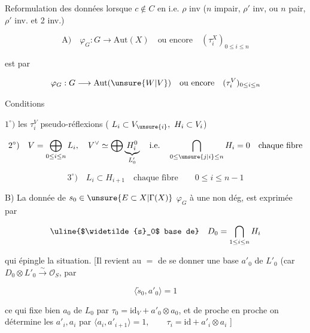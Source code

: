 
Reformulation des données lorsque $c\notin C$ en  i.e. $\rho$ inv ($n$ impair, $\rho'$ inv, ou $n$ pair, $\rho'$ inv. et 2 inv.)

\[
\text{A)}\quad \varphi_G:G\longrightarrow\mathrm{Aut}(X)\quad
\text{ou encore}\quad(\tau_i^X)_{0\le i\le n}
\]

est  par

\[
\varphi_G:G\longrightarrow\mathrm{Aut}(\unsure{W|V})\quad
\text{ou encore}\quad(\tau_i^V)_{0\le i\le n}
\]

Conditions

$1^\circ)$ les $\tau_i^V$ pseudo-réflexions ( $L_i\subset V_{\unsure{i}},\ H_i\subset V_i$)


\[
2^\circ)\quad V=\bigoplus_{0\le i\le n}L_i,\quad V^\vee\simeq
\bigoplus\underbrace{H_i^0}_{L'_0}\quad\text{i.e.}\quad
\bigcap_{0\le\unsure{j|i}\le n}H_i=0\quad\text{chaque fibre}
\]

\[
3^\circ)\quad L_i\subset H_{i+1}\quad\text{chaque fibre}\qquad0\le i\le n-1
\]

\deleted{\[
4^\circ)\quad\text{\unsure{Posant}}\quad D_0=\bigcap_{1\le i\le n}H_i,\quad\text{\unsure{il est|est}}
\]}

B) La donnée de $s_0\in\unsure{E\subset X|\Gamma(X)}$   $\varphi_G$ à une  non dég, est  exprimée par

\[
\text{\uline{$\widetilde{s}_0$ base de}}\quad D_0=\bigcap_{1\le i\le n}H_i
\]

qui épingle la situation.  [Il revient au $=$ de se donner une base  $a'_0$ de $L'_0$ (car $D_0\otimes L'_0\xrightarrow{\sim}\mathcal O_S$, par

\[
\boxed{\langle\widetilde{s}_0,a'_0\rangle=1}
\]

ce qui fixe bien $a_0$ de $L_0$ par $\tau_0=\mathrm{id}_V+a'_0\otimes a_0$, et de proche en proche on détermine les $a'_i,a_i$ par $\langle a_i,a'_{i+1}\rangle=1,\qquad\tau_i=\mathrm{id}+a'_i\otimes a_i$ ]
